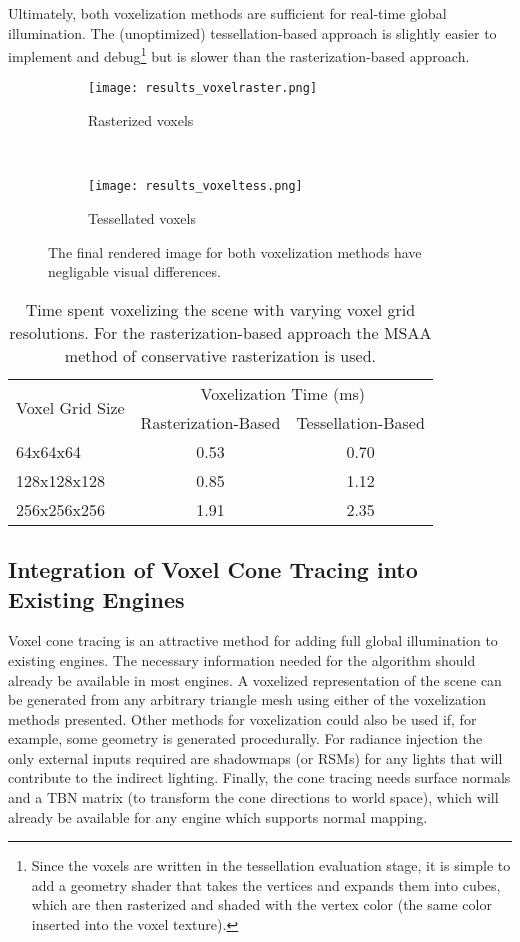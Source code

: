 Ultimately, both voxelization methods are sufficient for real-time global illumination. The (unoptimized) tessellation-based approach is slightly easier to implement and debug\footnote{Since the voxels are written in the tessellation evaluation stage, it is simple to add a geometry shader that takes the vertices and expands them into cubes, which are then rasterized and shaded with the vertex color (the same color inserted into the voxel texture).} but is slower than the rasterization-based approach.

\begin{figure}[h!]
\centering
    \begin{subfigure}[t]{0.4\textwidth}
        \texttt{[image: results\_voxelraster.png]}
        \caption{Rasterized voxels}
    \end{subfigure}
    ~
    \begin{subfigure}[t]{0.4\textwidth}
        \texttt{[image: results\_voxeltess.png]}
        \caption{Tessellated voxels}
    \end{subfigure}
    \caption{The final rendered image for both voxelization methods have negligable visual differences.}
    \label{fig:results_voxelization}
\end{figure}

\begin{table}[H]
\centering
\begin{tabular}{lcc}
\toprule
\multirow{2}{*}{Voxel Grid Size} & \multicolumn{2}{c}{Voxelization Time (ms)} \\
& Rasterization-Based & Tessellation-Based \\
\midrule
64x64x64        & 0.53 & 0.70\\
128x128x128     & 0.85 & 1.12\\
256x256x256     & 1.91 & 2.35\\
\bottomrule
\end{tabular}
\caption{Time spent voxelizing the scene with varying voxel grid resolutions. For the rasterization-based approach the MSAA method of conservative rasterization is used.}
\label{tbl:voxelizationtiming}
\end{table}

\subsection{Integration of Voxel Cone Tracing into Existing Engines}
Voxel cone tracing is an attractive method for adding full global illumination to existing engines. The necessary information needed for the algorithm should already be available in most engines. A voxelized representation of the scene can be generated from any arbitrary triangle mesh using either of the voxelization methods presented. Other methods for voxelization could also be used if, for example, some geometry is generated procedurally. For radiance injection the only external inputs required are shadowmaps (or RSMs) for any lights that will contribute to the indirect lighting. Finally, the cone tracing needs surface normals and a TBN matrix (to transform the cone directions to world space), which will already be available for any engine which supports normal mapping.

